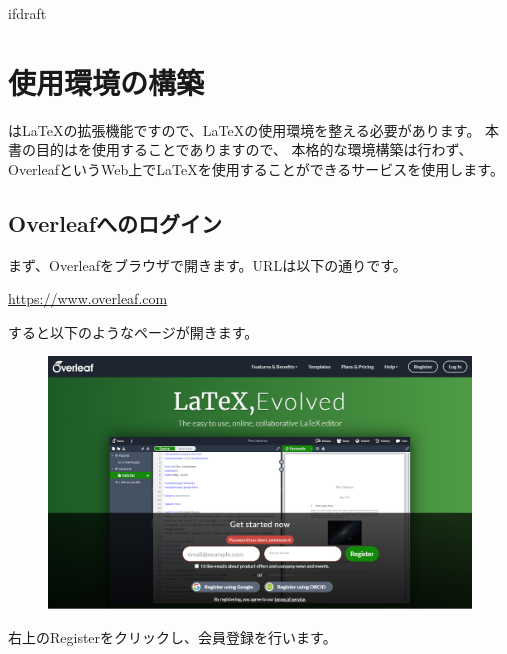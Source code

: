 \expandafter\ifx\csname ifdraft\endcsname\relax
    
	\graphicspath{{./figure/}}

\fi

\chapter{\logoLaTeX 使用環境の構築}
	\logoCiTikZ は\LaTeX の拡張機能ですので、\LaTeX の使用環境を整える必要があります。
	本書の目的は\logoCiTikZ を使用することでありますので、
	本格的な環境構築は行わず、OverleafというWeb上で\LaTeX を使用することができるサービスを使用します。
	
	
	\section{Overleafへのログイン}
		まず、Overleafをブラウザで開きます。URLは以下の通りです。
		\begin{mdframed}[style=shadow]
			\url{https://www.overleaf.com}
		\end{mdframed}\vspace{-3mm}
		すると以下のようなページが開きます。
		\begin{figure}[H]
			\centering
			\includegraphics[width=\textwidth]{overleaf-page-top.png}
		\end{figure}
		右上のRegisterをクリックし、会員登録を行います。
		
		\newpage
	
